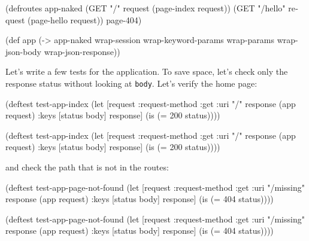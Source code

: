 \else

\begin{english}
  \begin{clojure}
(defroutes app-naked
  (GET "/"      request (page-index request))
  (GET "/hello" request (page-hello request))
  page-404)

(def app
  (-> app-naked
      wrap-session
      wrap-keyword-params
      wrap-params
      wrap-json-body
      wrap-json-response))
  \end{clojure}
\end{english}

\fi

Let's write a few tests for the application. To save space, let's check only the response status without looking at \verb|body|. Let's verify the home page:

\ifx\DEVICETYPE\MOBILE

\begin{english}
  \begin{clojure}
(deftest test-app-index
  (let [request {:request-method :get
                 :uri "/"}
        response (app request)
        {:keys [status body]} response]
    (is (= 200 status))))
  \end{clojure}
\end{english}

\else

\begin{english}
  \begin{clojure}
(deftest test-app-index
  (let [request {:request-method :get :uri "/"}
        response (app request)
        {:keys [status body]} response]
    (is (= 200 status))))
  \end{clojure}
\end{english}

\fi

\noindent
and check the path that is not in the routes:

\ifx\DEVICETYPE\MOBILE

\begin{english}
  \begin{clojure}
(deftest test-app-page-not-found
  (let [request {:request-method :get
                 :uri "/missing"}
        response (app request)
        {:keys [status body]} response]
    (is (= 404 status))))
  \end{clojure}
\end{english}

\else

\begin{english}
  \begin{clojure}
(deftest test-app-page-not-found
  (let [request {:request-method :get :uri "/missing"}
        response (app request)
        {:keys [status body]} response]
    (is (= 404 status))))
  \end{clojure}
\end{english}

